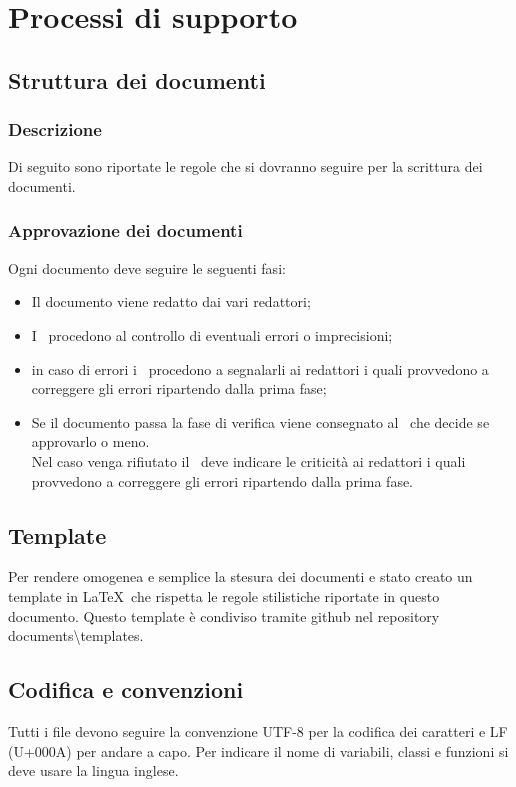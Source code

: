\documentclass[../NormeDiProgetto.tex]{subfiles}
\begin{document}
	\section{Processi di supporto}
		
		
		\subsection{Struttura dei documenti}
		\subsubsection{Descrizione}
		Di seguito sono riportate le regole che si dovranno seguire per la scrittura dei documenti. 
		
		\subsubsection{Approvazione dei documenti}
		Ogni documento deve seguire le seguenti fasi:
		\begin{itemize}
			\item Il documento viene redatto dai vari redattori;
			\item I \verificatore\  procedono al controllo di eventuali errori o imprecisioni;
			\item in caso di errori i \verificatore\ procedono a segnalarli ai redattori i quali provvedono a correggere gli errori ripartendo dalla prima fase;
			\item Se il documento passa la fase di verifica viene consegnato al \responsabilediprogetto\ che decide se approvarlo o meno.\\
			Nel caso venga rifiutato il \responsabilediprogetto\ deve indicare le criticità ai redattori i quali provvedono a correggere gli errori ripartendo dalla prima fase.
			
		\end{itemize} 
		\subsection{Template}
		Per rendere omogenea e semplice la stesura dei documenti e stato creato un template in \LaTeX\ che rispetta le regole stilistiche riportate in questo documento. Questo template è condiviso tramite github nel repository  documents\textbackslash templates.
		\subsection{Codifica e convenzioni}
		Tutti i file devono seguire la convenzione UTF-8 per la codifica dei caratteri e LF (U+000A) per andare a capo.
		Per indicare il nome di variabili, classi e funzioni si deve usare la lingua inglese.
		
\end{document}
